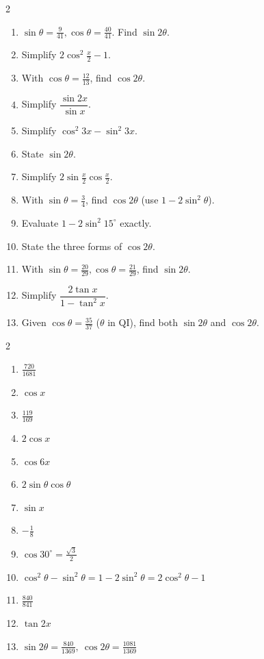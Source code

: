\documentclass[11pt]{article}
\begin{document}
\begin{recapbox}
\begin{multicols}{2}
\small
\begin{enumerate}[leftmargin=*,itemsep=3pt]
  \item $\sin\theta=\tfrac9{41},\cos\theta=\tfrac{40}{41}$. Find $\sin2\theta$.
  \item Simplify $2\cos^2\tfrac{x}{2}-1$.
  \item With $\cos\theta=\tfrac{12}{13}$, find $\cos2\theta$.
  \item Simplify $\dfrac{\sin2x}{\sin x}$.
  \item Simplify $\cos^2 3x-\sin^2 3x$.
  \item State $\sin2\theta$.
  \item Simplify $2\sin\tfrac{x}{2}\cos\tfrac{x}{2}$.
  \item With $\sin\theta=\tfrac34$, find $\cos2\theta$ (use $1-2\sin^2\theta$).
  \item Evaluate $1-2\sin^2 15^\circ$ exactly.
  \item State the three forms of $\cos2\theta$.
  \item With $\sin\theta=\tfrac{20}{29},\cos\theta=\tfrac{21}{29}$, find $\sin2\theta$.
  \item Simplify $\dfrac{2\tan x}{1-\tan^2 x}$.
  \item Given $\cos\theta=\tfrac{35}{37}$ ($\theta$ in QI), find both $\sin2\theta$ and $\cos2\theta$.
\end{enumerate}
\end{multicols}
\end{recapbox}

\begin{keybox}
\begin{multicols}{2}
\small
\begin{enumerate}[leftmargin=*,itemsep=3pt]
  \item $\tfrac{720}{1681}$
  \item $\cos x$
  \item $\tfrac{119}{169}$
  \item $2\cos x$
  \item $\cos6x$
  \item $2\sin\theta\cos\theta$
  \item $\sin x$
  \item $-\tfrac18$
  \item $\cos30^\circ=\tfrac{\sqrt3}{2}$
  \item $\cos^2\theta-\sin^2\theta=1-2\sin^2\theta=2\cos^2\theta-1$
  \item $\tfrac{840}{841}$
  \item $\tan2x$
  \item $\sin2\theta=\tfrac{840}{1369},\ \cos2\theta=\tfrac{1081}{1369}$
\end{enumerate}
\end{multicols}
\end{keybox}
\end{document}
